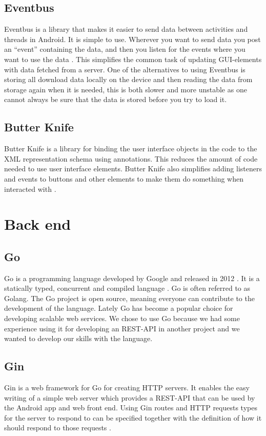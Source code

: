 \documentclass[../Main/thesis.tex]{subfiles}
\begin{document}
\subsection{Eventbus}
Eventbus is a library that makes it easier to send data between activities and threads in Android. 
It is simple to use.
Wherever you want to send data you post an ``event'' containing the data, and then you listen for the events where you want to use the data \citep{Greenrobot2016}.
This simplifies the common task of updating GUI-elements with data fetched from a server.
One of the alternatives to using Eventbus is storing all download data locally on the device and then reading the data from storage again when it is needed, this is both slower and more unstable as one cannot always be sure that the data is stored before you try to load it. 

\subsection{Butter Knife}
Butter Knife is a library for binding the user interface objects in the code to the XML representation schema using annotations.
This reduces the amount of code needed to use user interface elements. 
Butter Knife also simplifies adding listeners and events to buttons and other elements to make them do something when interacted with \citep{Wharton2018}.

\section{Back end}

\subsection{Go}
Go is a programming language developed by Google and released in 2012 \citep{Google2018a}.
It is a statically typed, concurrent and compiled language \citep{Pike2012}.
Go is often referred to as Golang. 
The Go project is open source, meaning everyone can contribute to the development of the language.
Lately Go has become a popular choice for developing scalable web services.
We chose to use Go because we had some experience using it for developing an REST-API in another project and we wanted to develop our skills with the language.

\subsection{Gin}
Gin is a web framework for Go for creating HTTP servers.
It enables the easy writing of a simple web server which provides a REST-API that can be used by the Android app and web front end. 
Using Gin routes and HTTP requests types for the server to respond to can be specified together with the definition of how it should respond to those requests \citep{Martinez-Almeida2017}.
\end{document}
